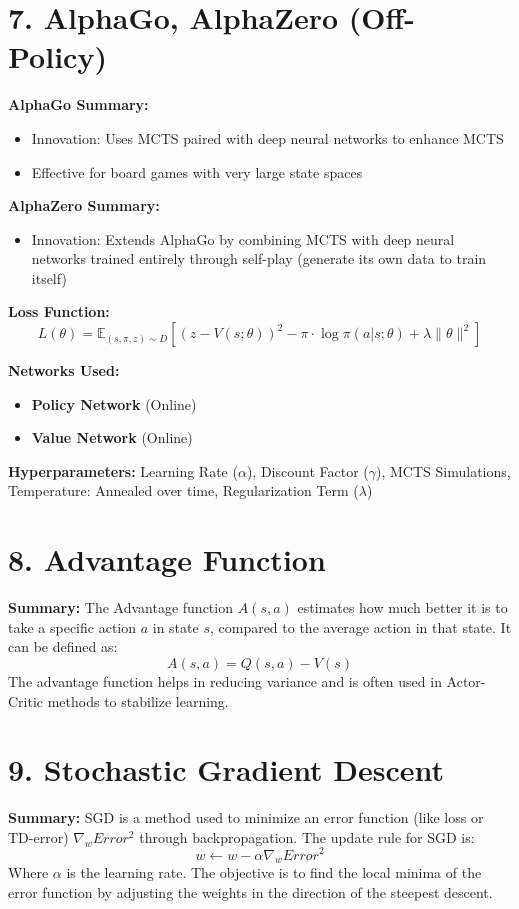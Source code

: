 \documentclass[letterpaper,10pt]{article}
\begin{document}
\begin{multicols}{2}
\section*{7. AlphaGo, AlphaZero (Off-Policy)}
\textbf{AlphaGo Summary:}
\begin{itemize}
    \item Innovation: Uses MCTS paired with deep neural networks to enhance MCTS
    \item Effective for board games with very large state spaces
\end{itemize}

\noindent \textbf{AlphaZero Summary:}
\begin{itemize}
    \item Innovation: Extends AlphaGo by combining MCTS with deep neural networks trained entirely through self-play (generate its own data to train itself)
\end{itemize}

\noindent \textbf{Loss Function:}
\[
L(\theta) = \mathbb{E}_{(s, \pi, z) \sim D} \left[ (z - V(s; \theta))^2 - \pi \cdot \log \pi(a|s; \theta) + \lambda \|\theta\|^2 \right]
\]

\noindent \textbf{Networks Used:}
\begin{itemize}
    \item \textbf{Policy Network} (Online)
    \item \textbf{Value Network} (Online)
\end{itemize}

\noindent \textbf{Hyperparameters: }Learning Rate (\(\alpha\)), Discount Factor (\(\gamma\)), MCTS Simulations, Temperature: Annealed over time, Regularization Term (\(\lambda\))

\section*{8. Advantage Function}
\textbf{Summary:} The Advantage function \( A(s, a) \) estimates how much better it is to take a specific action \( a \) in state \( s \), compared to the average action in that state. It can be defined as:
\[
A(s, a) = Q(s, a) - V(s)
\]
The advantage function helps in reducing variance and is often used in Actor-Critic methods to stabilize learning.

\section*{9. Stochastic Gradient Descent}
\textbf{Summary:} SGD is a method used to minimize an error function (like loss or TD-error) \( \nabla_w Error^2 \) through backpropagation. The update rule for SGD is:
\[
w \leftarrow w - \alpha \nabla_w Error^2
\]
Where \( \alpha \) is the learning rate. The objective is to find the local minima of the error function by adjusting the weights in the direction of the steepest descent.


\end{multicols}
\end{document}
